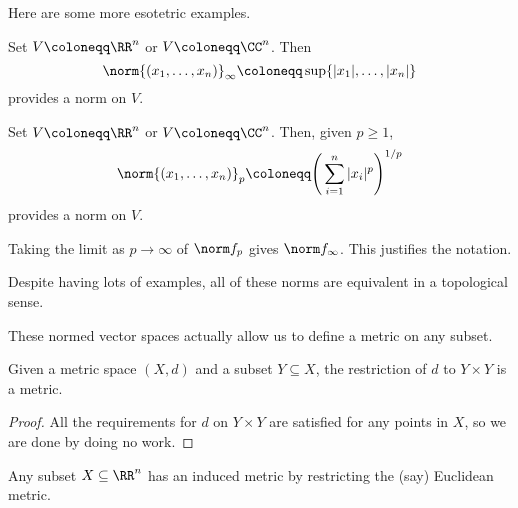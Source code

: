 \documentclass[../notes.tex]{subfiles}
\begin{document}
Here are some more esotetric examples.
\begin{example}
	Set $V\coloneqq\RR^n$ or $V\coloneqq\CC^n$. Then
	\[\norm{(x_1,\ldots,x_n)}_\infty\coloneqq\sup\{|x_1|,\ldots,|x_n|\}\]
	provides a norm on $V$.
\end{example}
\begin{example} \label{ex:pnormonr}
	Set $V\coloneqq\RR^n$ or $V\coloneqq\CC^n$. Then, given $p\ge1$,
	\[\norm{(x_1,\ldots,x_n)}_p\coloneqq\Bigg(\sum_{i=1}^n|x_i|^p\Bigg)^{1/p}\]
	provides a norm on $V$.
\end{example}
\begin{remark}
	Taking the limit as $p\to\infty$ of $\norm f_p$ gives $\norm f_\infty$. This justifies the notation.
\end{remark}
\begin{remark}
	Despite having lots of examples, all of these norms are equivalent in a topological sense.
\end{remark}
These normed vector spaces actually allow us to define a metric on any subset.
\begin{proposition}
	Given a metric space $(X,d)$ and a subset $Y\subseteq X$, the restriction of $d$ to $Y\times Y$ is a metric.
\end{proposition}
\begin{proof}
	All the requirements for $d$ on $Y\times Y$ are satisfied for any points in $X$, so we are done by doing no work.
\end{proof}
\begin{example}
	Any subset $X\subseteq\RR^n$ has an induced metric by restricting the (say) Euclidean metric.
\end{example}
\end{document}
